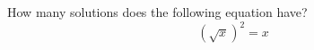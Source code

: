\documentclass{ximera}
\author{David Kish}
\begin{document}
\begin{exercise}
How many solutions does the following equation have? \\
\[
{(\sqrt{x})}^2=x
\]
\begin{multipleChoice}  
\end{multipleChoice}  
\end{exercise}
\end{document}
